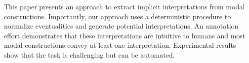 This paper presents an approach to extract implicit interpretations from modal constructions. Importantly, our approach uses a deterministic procedure to normalize eventualities and generate potential interpretations. An annotation effort demonstrates that these interpretations are intuitive to humans and most modal constructions convey at least one interpretation. Experimental results show that the task is challenging but can be automated.
